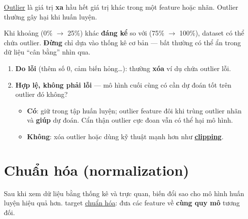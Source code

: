 \documentclass[12pt,a4paper]{article}
\begin{document}
\begin{dinhnghia}[title={Outlier}]
\href{https://developers.google.com/machine-learning/glossary\#outliers}{Outlier} là giá trị \textbf{xa} hầu hết giá trị khác trong một feature hoặc nhãn. Outlier thường gây hại khi huấn luyện.
\end{dinhnghia}

\begin{luuy}
Khi khoảng (0\% $\to$ 25\%) khác \textbf{đáng kể} so với (75\% $\to$ 100\%), dataset có thể chứa outlier. \textbf{Đừng} chỉ dựa vào thống kê cơ bản --- bất thường có thể ẩn trong dữ liệu ``cân bằng'' nhìn qua.
\end{luuy}

\begin{phuongphap}[title={Ba loại outlier và cách xử lý}]
\begin{enumerate}
  \item \textbf{Do lỗi} (thêm số 0, cảm biến hỏng\ldots): thường \textbf{xóa} ví dụ chứa outlier lỗi.
  \item \textbf{Hợp lệ, không phải lỗi} --- mô hình cuối cùng có cần dự đoán tốt trên outlier đó không?
  \begin{itemize}
    \item \textbf{Có}: giữ trong tập huấn luyện; outlier feature đôi khi trùng outlier nhãn và \textbf{giúp} dự đoán. Cẩn thận outlier cực đoan vẫn có thể hại mô hình.
    \item \textbf{Không}: xóa outlier hoặc dùng kỹ thuật mạnh hơn như \href{https://developers.google.com/machine-learning/glossary\#clipping}{\textbf{clipping}}.
  \end{itemize}
\end{enumerate}
\end{phuongphap}

\section{Chuẩn hóa (normalization)}

\begin{dongco}
Sau khi xem dữ liệu bằng thống kê và trực quan, biến đổi sao cho mô hình huấn luyện hiệu quả hơn. target \href{https://developers.google.com/machine-learning/glossary\#normalization}{chuẩn hóa}: đưa các feature về \textbf{cùng quy mô} tương đối.
\end{dongco}
\end{document}

